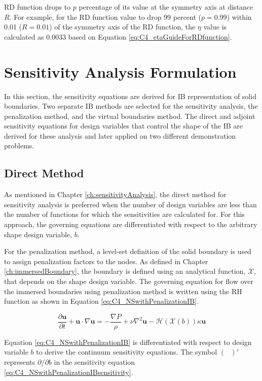 RD function drops to $p$ percentage of its value at the symmetry axis at distance $R$. For example, for the RD function value to drop 99 percent ($p = 0.99$) within 0.01 ($R = 0.01$) of the symmetry axis of the RD function, the $\eta$ value is calculated as $0.0033$ based on Equation \eqref{eq:C4_etaGuideForRDfunction}.

\section{Sensitivity Analysis Formulation}
In this section, the sensitivity equations are derived for IB representation of solid boundaries. Two separate IB methods are selected for the sensitivity analysis, the penalization method, and the virtual boundaries method. The direct and adjoint sensitivity equations for design variables that control the shape of the IB are derived for these analysis and later applied on two different demonstration problems. 

\subsection{Direct Method}
As mentioned in Chapter \ref{ch:sensitivityAnalysis}, the direct method for sensitivity analysis is preferred when the number of design variables are less than the number of functions for which the sensitivities are calculated for. For this approach, the governing equations are differentiated with respect to the arbitrary shape design variable, $b$.

For the penalization method, a level-set definition of the solid boundary is used to assign penalization factors to the nodes. As defined in Chapter \ref{ch:immersedBoundary}, the boundary is defined using an analytical function, $\mathcal{X}$, that depends on the shape design variable. The governing equation for flow over the immersed boundaries using penalization method is written using the RH function as shown in Equation \eqref{eq:C4_NSwithPenalizationIB}.

\begin{equation}\label{eq:C4_NSwithPenalizationIB}
    \frac{\partial \mathbf{u}}{\partial t} + \mathbf{u} \cdot \nabla \mathbf{u} = 
    -\frac{\nabla P}{\rho} + \nu \nabla^2 \mathbf{u} -\mathcal{H}(\mathcal{X}(b)) \kappa \mathbf{u}
\end{equation}

Equation \eqref{eq:C4_NSwithPenalizationIB} is differentiated with respect to design variable $b$ to derive the continuum sensitivity equations. The symbol $(\text{ })'$ represents $\partial /\partial b$ in the sensitivity equation \eqref{eq:C4_NSwithPenalizationIBsensitivity}.


